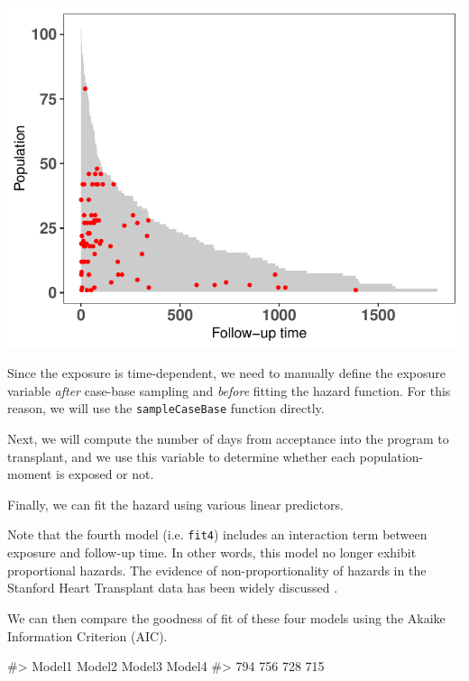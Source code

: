 \documentclass[
]{jss}
\begin{document}
\begin{CodeChunk}


\begin{center}\includegraphics{../figures/stanford-poptime-1} \end{center}

\end{CodeChunk}

Since the exposure is time-dependent, we need to manually define the
exposure variable \emph{after} case-base sampling and \emph{before}
fitting the hazard function. For this reason, we will use the
\texttt{sampleCaseBase} function directly.

Next, we will compute the number of days from acceptance into the
program to transplant, and we use this variable to determine whether
each population-moment is exposed or not.

Finally, we can fit the hazard using various linear predictors.

Note that the fourth model (i.e. \texttt{fit4}) includes an interaction
term between exposure and follow-up time. In other words, this model no
longer exhibit proportional hazards. The evidence of non-proportionality
of hazards in the Stanford Heart Transplant data has been widely
discussed \citep{arjas1988graphical}.

We can then compare the goodness of fit of these four models using the
Akaike Information Criterion (AIC).

\begin{CodeChunk}

\begin{CodeOutput}
#> Model1 Model2 Model3 Model4 
#>    794    756    728    715
\end{CodeOutput}
\end{CodeChunk}
\end{document}
